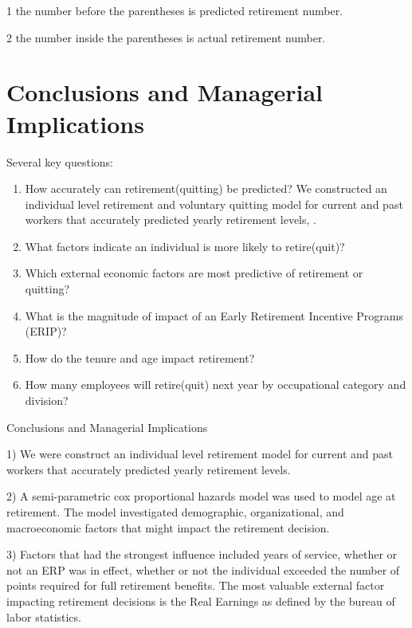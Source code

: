 \documentclass[12pt,letterpaper]{article}
\begin{document}
\begin{table}[h!]
\begin{threeparttable}
\begin{tabular}{cL{1.2cm}L{1.2cm}L{1.2cm}L{1.2cm}L{1.2cm}L{1.2cm}L{1.2cm}L{1.2cm}L{1.2cm}l}
			\bottomrule
		\end{tabular}%
		\begin{tablenotes}
			\item[1] the number before the parentheses is predicted retirement number.
			\item[2] the number inside the parentheses is actual retirement number.
		\end{tablenotes}
		
	\end{threeparttable}
	\label{tab:VQEIcocscode}
\end{table}


\section{Conclusions and Managerial Implications}

Several key questions:
\begin{enumerate}
	\item How accurately can retirement(quitting) be predicted?
	We constructed an individual level retirement and voluntary quitting model for current and past workers that accurately predicted yearly retirement levels, .
	\item What factors indicate an individual is more likely to retire(quit)?
	\item Which external economic factors are most predictive of retirement or quitting?
	\item What is the magnitude  of impact of an Early Retirement Incentive Programs (ERIP)?
	\item How do the tenure and age impact retirement?
	\item How many employees will retire(quit) next year by occupational category and division?
\end{enumerate}


Conclusions and Managerial Implications

1) We were construct an individual level retirement model for current and past workers that accurately predicted yearly retirement levels.

2) A semi-parametric cox proportional hazards model was used to model age at retirement.  The model investigated demographic, organizational, and macroeconomic factors that might impact the retirement decision.

3) Factors that had the strongest influence included years of service, whether or not an ERP was in effect, whether or not the individual exceeded the number of points required for full retirement benefits.  The most valuable external factor impacting retirement decisions is the Real Earnings as defined by the bureau of labor statistics.
\end{document}

